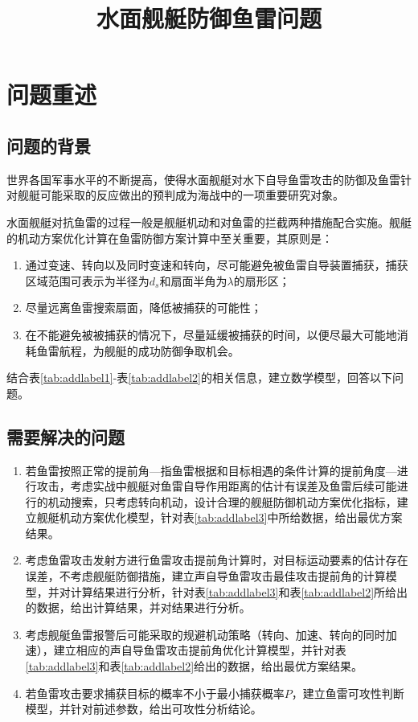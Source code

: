 \documentclass[12pt]{article}%
\title{ \heiti\zihao{3}水面舰艇防御鱼雷问题}
\author{}
\date{}
\begin{document}
\section{问题重述}
\subsection{问题的背景}
世界各国军事水平的不断提高，使得水面舰艇对水下自导鱼雷攻击的防御及鱼雷针对舰艇可能采取的反应做出的预判成为海战中的一项重要研究对象。

水面舰艇对抗鱼雷的过程一般是舰艇机动和对鱼雷的拦截两种措施配合实施。舰艇的机动方案优化计算在鱼雷防御方案计算中至关重要，其原则是：
\begin{enumerate}[1)]\addtolength{\itemsep}{-1.5ex}
\item 通过变速、转向以及同时变速和转向，尽可能避免被鱼雷自导装置捕获，捕获区域范围可表示为半径为$d_s$和扇面半角为$\lambda$的扇形区；
\item 尽量远离鱼雷搜索扇面，降低被捕获的可能性；
\item 在不能避免被被捕获的情况下，尽量延缓被捕获的时间，以便尽最大可能地消耗鱼雷航程，为舰艇的成功防御争取机会。
\end{enumerate}
结合表\ref{tab:addlabel1}-表\ref{tab:addlabel2}的相关信息，建立数学模型，回答以下问题。
\subsection{需要解决的问题}

\begin{enumerate}\addtolength{\itemsep}{-1.5ex}

\item 若鱼雷按照正常的提前角—指鱼雷根据和目标相遇的条件计算的提前角度—进行攻击，考虑实战中舰艇对鱼雷自导作用距离的估计有误差及鱼雷后续可能进行的机动搜索，只考虑转向机动，设计合理的舰艇防御机动方案优化指标，建立舰艇机动方案优化模型，针对表\ref{tab:addlabel3}中所给数据，给出最优方案结果。
\item 考虑鱼雷攻击发射方进行鱼雷攻击提前角计算时，对目标运动要素的估计存在误差，不考虑舰艇防御措施，建立声自导鱼雷攻击最佳攻击提前角的计算模型，并对计算结果进行分析，针对表\ref{tab:addlabel3}和表\ref{tab:addlabel2}所给出的数据，给出计算结果，并对结果进行分析。
\item 考虑舰艇鱼雷报警后可能采取的规避机动策略（转向、加速、转向的同时加速），建立相应的声自导鱼雷攻击提前角优化计算模型，并针对表\ref{tab:addlabel3}和表\ref{tab:addlabel2}给出的数据，给出最优方案结果。
\item 若鱼雷攻击要求捕获目标的概率不小于最小捕获概率$P$，建立鱼雷可攻性判断模型，并针对前述参数，给出可攻性分析结论。
\end{enumerate}
\end{document}
